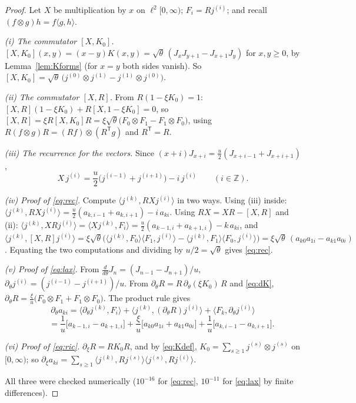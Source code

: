 \documentclass[11pt]{article}
\theoremstyle{definition}
\theoremstyle{remark}
\newcommand{\Z}{\mathbb{Z}}
\begin{document}
\begin{proof}
Let $X$ be multiplication by $x$ on $\ell^2[0,\infty)$; $F_i=Rj^{(i)}$; and recall $(f\otimes g)h=f\langle g,h\rangle$.

\emph{(i) The commutator $[X,K_0]$.} $[X,K_0](x,y)=(x-y)K(x,y)=\sqrt\theta\,(J_xJ_{y+1}-J_{x+1}J_y)$ for $x,y\ge0$, by Lemma~\ref{lem:Kforms} (for $x=y$ both sides vanish). So $[X,K_0]=\sqrt\theta\,\bigl(j^{(0)}\otimes j^{(1)}-j^{(1)}\otimes j^{(0)}\bigr)$.

\emph{(ii) The commutator $[X,R]$.} From $R(1-\xi K_0)=1$: $[X,R](1-\xi K_0)+R[X,1-\xi K_0]=0$, so $[X,R]=\xi R[X,K_0]R=\xi\sqrt\theta\bigl(F_0\otimes F_1-F_1\otimes F_0\bigr)$, using $R(f\otimes g)R=(Rf)\otimes(R^{\mathsf T}g)$ and $R^{\mathsf T}=R$.

\emph{(iii) The recurrence for the vectors.} Since $(x+i)J_{x+i}=\frac u2(J_{x+i-1}+J_{x+i+1})$,
\[
X\,j^{(i)}=\frac u2\bigl(j^{(i-1)}+j^{(i+1)}\bigr)-i\,j^{(i)}\qquad(i\in\Z).
\]

\emph{(iv) Proof of \eqref{eq:rec}.} Compute $\langle j^{(k)},RXj^{(i)}\rangle$ in two ways. Using (iii) inside: $\langle j^{(k)},RXj^{(i)}\rangle=\frac u2(a_{k,i-1}+a_{k,i+1})-i\,a_{ki}$. Using $RX=XR-[X,R]$ and (ii): $\langle j^{(k)},XRj^{(i)}\rangle=\langle Xj^{(k)},F_i\rangle=\frac u2(a_{k-1,i}+a_{k+1,i})-k\,a_{ki}$, and $\langle j^{(k)},[X,R]j^{(i)}\rangle=\xi\sqrt\theta\bigl(\langle j^{(k)},F_0\rangle\langle F_1,j^{(i)}\rangle-\langle j^{(k)},F_1\rangle\langle F_0,j^{(i)}\rangle\bigr)=\xi\sqrt\theta\,(a_{k0}a_{1i}-a_{k1}a_{0i})$. Equating the two computations and dividing by $u/2=\sqrt\theta$ gives \eqref{eq:rec}.

\emph{(v) Proof of \eqref{eq:lax}.} From $\frac{d}{d\theta}J_n=(J_{n-1}-J_{n+1})/u$, $\partial_\theta j^{(i)}=(j^{(i-1)}-j^{(i+1)})/u$. From $\partial_\theta R=R\,\partial_\theta(\xi K_0)\,R$ and \eqref{eq:dK}, $\partial_\theta R=\frac{\xi}{u}\bigl(F_0\otimes F_1+F_1\otimes F_0\bigr)$. The product rule gives
\[
\partial_\theta a_{ki}=\langle\partial_\theta j^{(k)},F_i\rangle+\langle j^{(k)},(\partial_\theta R)j^{(i)}\rangle+\langle F_k,\partial_\theta j^{(i)}\rangle
\]
\[
\phantom{\partial_\theta a_{ki}}=\frac1u\bigl[a_{k-1,i}-a_{k+1,i}\bigr]+\frac{\xi}{u}\bigl[a_{k0}a_{1i}+a_{k1}a_{0i}\bigr]+\frac1u\bigl[a_{k,i-1}-a_{k,i+1}\bigr].
\]

\emph{(vi) Proof of \eqref{eq:ric}.} $\partial_\xi R=RK_0R$, and by \eqref{eq:Kdef}, $K_0=\sum_{s\ge1}j^{(s)}\otimes j^{(s)}$ on $[0,\infty)$; so $\partial_\xi a_{ki}=\sum_{s\ge1}\langle j^{(k)},Rj^{(s)}\rangle\langle j^{(s)},Rj^{(i)}\rangle$.

All three were checked numerically ($10^{-16}$ for \eqref{eq:rec}, $10^{-11}$ for \eqref{eq:lax} by finite differences).
\end{proof}
\end{document}
